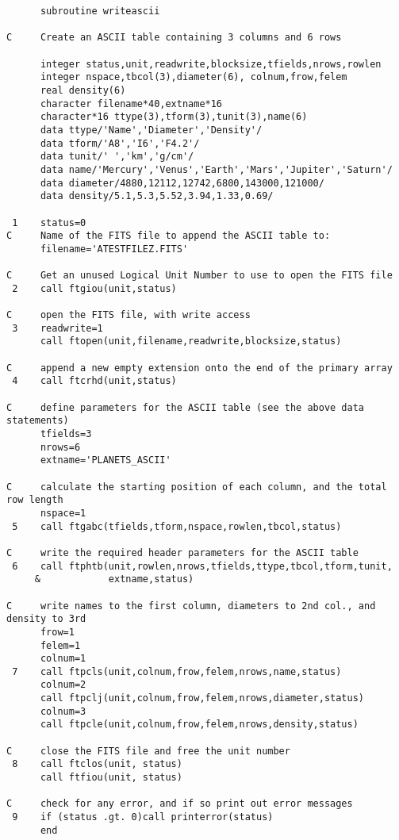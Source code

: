 \newpage
\footnotesize
\begin{verbatim}
      subroutine writeascii

C     Create an ASCII table containing 3 columns and 6 rows

      integer status,unit,readwrite,blocksize,tfields,nrows,rowlen
      integer nspace,tbcol(3),diameter(6), colnum,frow,felem
      real density(6)
      character filename*40,extname*16
      character*16 ttype(3),tform(3),tunit(3),name(6)
      data ttype/'Name','Diameter','Density'/
      data tform/'A8','I6','F4.2'/
      data tunit/' ','km','g/cm'/
      data name/'Mercury','Venus','Earth','Mars','Jupiter','Saturn'/
      data diameter/4880,12112,12742,6800,143000,121000/
      data density/5.1,5.3,5.52,3.94,1.33,0.69/

 1    status=0
C     Name of the FITS file to append the ASCII table to:
      filename='ATESTFILEZ.FITS'

C     Get an unused Logical Unit Number to use to open the FITS file
 2    call ftgiou(unit,status)

C     open the FITS file, with write access
 3    readwrite=1
      call ftopen(unit,filename,readwrite,blocksize,status)

C     append a new empty extension onto the end of the primary array
 4    call ftcrhd(unit,status)

C     define parameters for the ASCII table (see the above data statements)
      tfields=3
      nrows=6
      extname='PLANETS_ASCII'
      
C     calculate the starting position of each column, and the total row length
      nspace=1
 5    call ftgabc(tfields,tform,nspace,rowlen,tbcol,status)

C     write the required header parameters for the ASCII table
 6    call ftphtb(unit,rowlen,nrows,tfields,ttype,tbcol,tform,tunit,
     &            extname,status)

C     write names to the first column, diameters to 2nd col., and density to 3rd
      frow=1
      felem=1
      colnum=1
 7    call ftpcls(unit,colnum,frow,felem,nrows,name,status)
      colnum=2
      call ftpclj(unit,colnum,frow,felem,nrows,diameter,status)  
      colnum=3
      call ftpcle(unit,colnum,frow,felem,nrows,density,status)  

C     close the FITS file and free the unit number
 8    call ftclos(unit, status)
      call ftfiou(unit, status)

C     check for any error, and if so print out error messages
 9    if (status .gt. 0)call printerror(status)
      end
\end{verbatim}
\normalsize
\newpage
